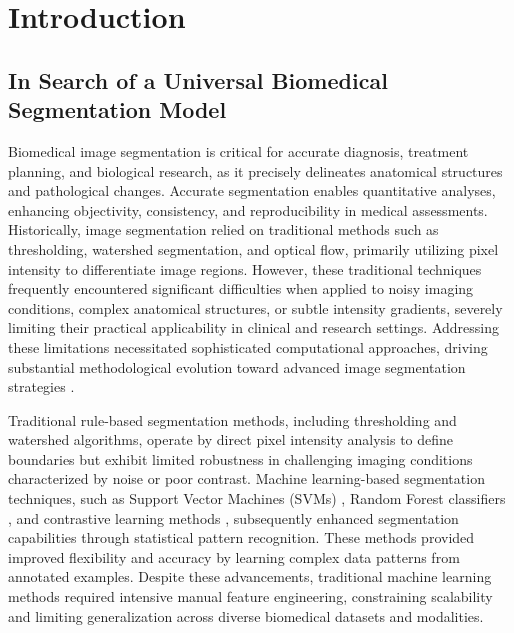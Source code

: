\documentclass[./dissertation.tex]{subfiles}
\begin{document}
\chapter{Introduction}
\label{ch:intro}

\section{In Search of a Universal Biomedical Segmentation Model}
Biomedical image segmentation is critical for accurate diagnosis, treatment planning, and biological research, as it precisely delineates anatomical structures and pathological changes. Accurate segmentation enables quantitative analyses, enhancing objectivity, consistency, and reproducibility in medical assessments. Historically, image segmentation relied on traditional methods such as thresholding, watershed segmentation, and optical flow, primarily utilizing pixel intensity to differentiate image regions. However, these traditional techniques frequently encountered significant difficulties when applied to noisy imaging conditions, complex anatomical structures, or subtle intensity gradients, severely limiting their practical applicability in clinical and research settings. Addressing these limitations necessitated sophisticated computational approaches, driving substantial methodological evolution toward advanced image segmentation strategies \cite{isensee2021nnu, hatamizadeh2022unetr}.


Traditional rule-based segmentation methods, including thresholding and watershed algorithms, operate by direct pixel intensity analysis to define boundaries but exhibit limited robustness in challenging imaging conditions characterized by noise or poor contrast. Machine learning-based segmentation techniques, such as Support Vector Machines (SVMs) \cite{cortes1995support}, Random Forest classifiers \cite{breiman2001random}, and contrastive learning methods \cite{chen2020simple}, subsequently enhanced segmentation capabilities through statistical pattern recognition. These methods provided improved flexibility and accuracy by learning complex data patterns from annotated examples. Despite these advancements, traditional machine learning methods required intensive manual feature engineering, constraining scalability and limiting generalization across diverse biomedical datasets and modalities.
\end{document}
